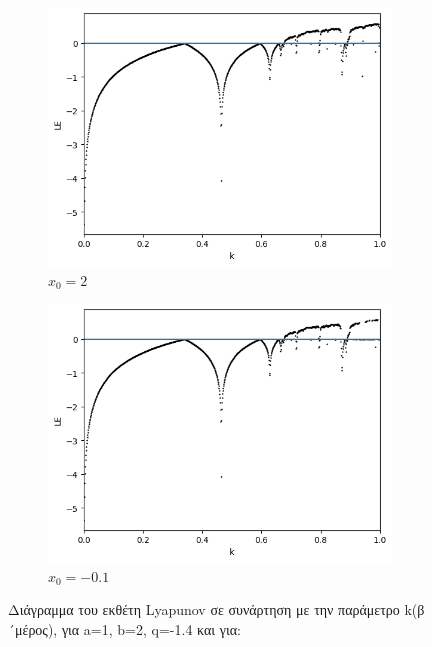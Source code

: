 \begin{figure}[h!]
	\centering
	\begin{subfigure}[b]{0.45\textwidth}
		\centering
		\includegraphics[width=\textwidth]{LateX images/graphs q16/g11}
		\caption{\(x_0=2\)}
		\label{f:g37}
	\end{subfigure}
	\hfill
	\begin{subfigure}[b]{0.45\textwidth}
		\centering
		\includegraphics[width=\textwidth]{LateX images/graphs q16/g12}
		\caption{\(x_0=-0.1\)}
		\label{f:g38}
	\end{subfigure}
	\hfill
	\caption{ Διάγραμμα του εκθέτη Lyapunov σε συνάρτηση με την παράμετρο k(β´μέρος), για a=1, b=2, q=-1.4 και για:}
\end{figure}


